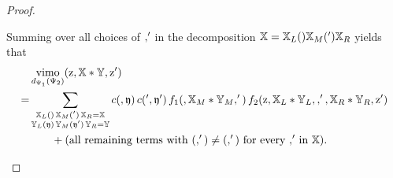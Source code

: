 \documentclass[15pt,oneside,reqno]{amsart}
\theoremstyle{remark}{
\newtheorem{lem}[df]{Lemma}
\newtheorem{prop}[df]{Proposition}
\newtheorem{ex}[df]{Example}
\newtheorem{rmk}[df]{Remark}
}
\newcommand{\ide}[1]{\mathfrak{#1}}
\DeclareMathOperator{\vimo}{vimo}
\let\x\relax
\newcommand{\x}{\mathrm{x}}
\newcommand{\z}{\mathrm{z}}
\let\v\relax
\newcommand{\v}{\mathrm{v}}
\begin{document}
\begin{proof}
\begin{itemize}
Summing over all choices of $\x,\x'$ in the decomposition $\mathbb{X}=\mathbb{X}_L(\x)\mathbb{X}_M(\x')\mathbb{X}_R$ yields that
\begin{equation*}
\begin{aligned}
&\vimo_{d_{\Psi_1}(\Psi_2)}(\z,\mathbb{X}*\mathbb{Y},\z')\\
=&
\sum_{\substack{\mathbb{X}_L(\x)\,\mathbb{X}_M(\x')\,\mathbb{X}_R=\mathbb{X}\\
\mathbb{Y}_L(\ide{y})\,\mathbb{Y}_M(\ide{y}')\,\mathbb{Y}_R=\mathbb{Y}}}
c(\x,\ide{y})\,c(\x',\ide{y}')\,
f_1(\x,\mathbb{X}_M*\mathbb{Y}_M,\x')\,
f_2(\z,\mathbb{X}_L*\mathbb{Y}_L,\x,\x',\mathbb{X}_R*\mathbb{Y}_R,\z')\\
&\qquad + \text{(all remaining terms with $(\v,\v')\neq(\x,\x')$ for every $\x,\x'$ in $\mathbb{X}$)}.
\end{aligned}
\end{equation*}
\end{itemize}
\end{proof}
\end{document}
